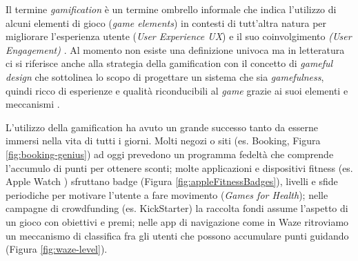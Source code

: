 Il termine \textit{gamification} è un termine ombrello informale che indica l'utilizzo di alcuni elementi di gioco (\textit{game elements}) in contesti di tutt'altra natura per migliorare l'esperienza utente (\textit{User Experience UX}) e il suo coinvolgimento \textit{(User Engagement)} \cite{gamificCHI11}.
Al momento non esiste una definizione univoca ma in letteratura ci si riferisce anche alla strategia della gamification con il concetto di \textit{gameful design} che sottolinea lo scopo di progettare un sistema che sia \textit{gamefulness}, quindi ricco di esperienze e qualità riconducibili al \textit{game} grazie ai suoi elementi e meccanismi \cite{definingGamification2011}.

L'utilizzo della gamification ha avuto un grande successo tanto da esserne immersi nella vita di tutti i giorni. Molti negozi o siti (es. Booking, Figura \ref{fig:booking-genius}) ad oggi prevedono un programma fedeltà che comprende l'accumulo di punti per ottenere sconti; molte applicazioni e dispositivi fitness (es. Apple Watch \cite{appleWatchGamification}) sfruttano badge (Figura \ref{fig:appleFitnessBadges}), livelli e sfide periodiche per motivare l'utente a fare movimento (\textit{Games for Health})\cite{game4health}; nelle campagne di crowdfunding (es. KickStarter) la raccolta fondi assume l'aspetto di un gioco con obiettivi e premi; nelle app di navigazione come in Waze ritroviamo un meccanismo di classifica fra gli utenti che possono accumulare punti guidando (Figura \ref{fig:waze-level}).

